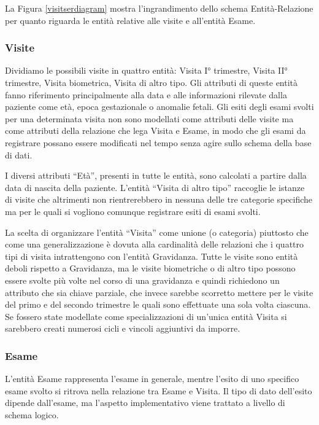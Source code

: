 La Figura \ref{visitserdiagram} mostra l'ingrandimento dello schema Entità-Relazione per quanto riguarda le entità relative alle visite e all'entità Esame.

\subsubsection{Visite}

Dividiamo le possibili visite in quattro entità: Visita I° trimestre, Visita II° trimestre, Visita biometrica, Visita di altro tipo.
Gli attributi di queste entità fanno riferimento principalmente alla data e alle informazioni rilevate dalla paziente come età, epoca gestazionale o anomalie fetali.
Gli esiti degli esami svolti per una determinata visita non sono modellati come attributi delle visite ma come attributi della relazione che lega Visita e Esame, in modo che gli esami da registrare possano essere modificati nel tempo senza agire sullo schema della base di dati.

I diversi attributi \enquote{Età}, presenti in tutte le entità, sono calcolati a partire dalla data di nascita della paziente.
L'entità \enquote{Visita di altro tipo} raccoglie le istanze di visite che altrimenti non rientrerebbero in nessuna delle tre categorie specifiche ma per le quali si vogliono comunque registrare esiti di esami svolti.

La scelta di organizzare l'entità \enquote{Visita} come unione (o categoria) piuttosto che come una generalizzazione è dovuta alla cardinalità delle relazioni che i quattro tipi di visita intrattengono con l'entità Gravidanza.
Tutte le visite sono entità deboli rispetto a Gravidanza, ma le visite biometriche o di altro tipo possono essere svolte più volte nel corso di una gravidanza e quindi richiedono un attributo che sia chiave parziale, che invece sarebbe scorretto mettere per le visite del primo e del secondo trimestre le quali sono effettuate una sola volta ciascuna.
Se fossero state modellate come specializzazioni di un'unica entità Visita si sarebbero creati numerosi cicli e vincoli aggiuntivi da imporre. 

\subsubsection{Esame}

L'entità Esame rappresenta l'esame in generale, mentre l'esito di uno specifico esame svolto si ritrova nella relazione tra Esame e Visita.
Il tipo di dato dell'esito dipende dall'esame, ma l'aspetto implementativo viene trattato a livello di schema logico.

